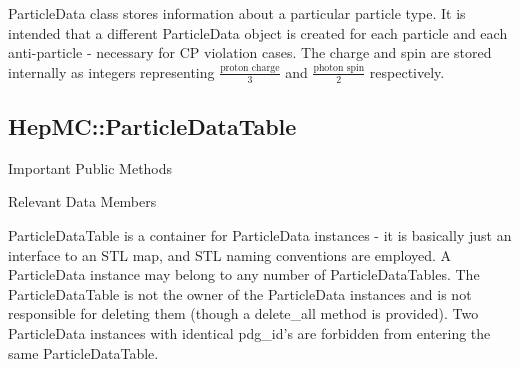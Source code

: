 \documentclass[11pt,letterpaper]{article}
\begin{document}
ParticleData class stores information about a particular particle
type. It is intended that a different ParticleData object is created 
for each particle and each anti-particle - necessary for CP violation
cases. The charge and spin are stored internally as integers representing
$\frac{\mbox{proton charge}}{3}$ and $\frac{\mbox{photon spin}}{2}$
respectively. 

%
%

\subsection{HepMC::ParticleDataTable}
\begin{myitemize}{Important Public Methods}
\end{myitemize}
\begin{myitemize}{Relevant Data Members}
\end{myitemize}

ParticleDataTable is a container for ParticleData instances - it is
basically just an interface to an STL map, and STL naming conventions
are employed. A ParticleData instance may belong to any number of
ParticleDataTables. The ParticleDataTable is not the owner of the
ParticleData instances and is not responsible for deleting them
(though a delete\_all method is provided). Two ParticleData instances
with identical pdg\_id's are forbidden from entering the same
ParticleDataTable. 
\end{document}
